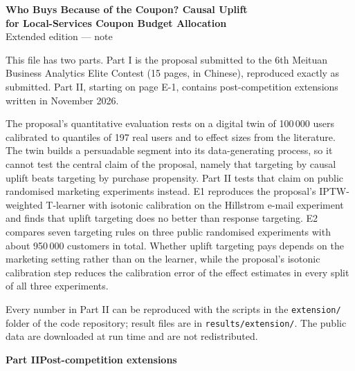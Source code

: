 
\graphicspath{{../../figures/extension/}}

\thispagestyle{empty}
\begin{center}
{\Large\bfseries Who Buys Because of the Coupon? Causal Uplift\\[0.2em] for Local-Services Coupon Budget Allocation}\\[0.7em]
{\large Extended edition --- note}
\end{center}
\vspace{0.8em}

This file has two parts. Part I is the proposal submitted to the 6th Meituan Business Analytics Elite Contest (15 pages, in Chinese), reproduced exactly as submitted. Part II, starting on page E-1, contains post-competition extensions written in November 2026.

The proposal's quantitative evaluation rests on a digital twin of 100\,000 users calibrated to quantiles of 197 real users and to effect sizes from the literature. The twin builds a persuadable segment into its data-generating process, so it cannot test the central claim of the proposal, namely that targeting by causal uplift beats targeting by purchase propensity. Part II tests that claim on public randomised marketing experiments instead. E1 reproduces the proposal's IPTW-weighted T-learner with isotonic calibration on the Hillstrom e-mail experiment and finds that uplift targeting does no better than response targeting. E2 compares seven targeting rules on three public randomised experiments with about 950\,000 customers in total. Whether uplift targeting pays depends on the marketing setting rather than on the learner, while the proposal's isotonic calibration step reduces the calibration error of the effect estimates in every split of all three experiments.

Every number in Part II can be reproduced with the scripts in the \texttt{extension/} folder of the code repository; result files are in \texttt{results/extension/}. The public data are downloaded at run time and are not redistributed.

\clearpage
{}

\setcounter{page}{1}
\begin{center}{\Large\bfseries Part II\quad Post-competition extensions}\end{center}

